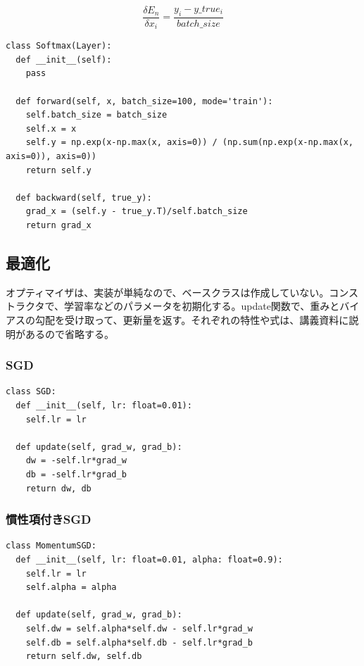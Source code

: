 \documentclass[platex,dvipdfmx]{jsarticle}
\begin{document}
\[
  \frac{\delta E_n}{\delta x_i} = \frac{y_i - y\_true_i}{batch\_size}
\]

\begin{lstlisting}[caption=ex\_advanced.py, label=Softmax]
class Softmax(Layer):
  def __init__(self):
    pass

  def forward(self, x, batch_size=100, mode='train'):
    self.batch_size = batch_size
    self.x = x
    self.y = np.exp(x-np.max(x, axis=0)) / (np.sum(np.exp(x-np.max(x, axis=0)), axis=0))
    return self.y

  def backward(self, true_y):
    grad_x = (self.y - true_y.T)/self.batch_size
    return grad_x
\end{lstlisting}

\newpage

\subsection{最適化}

オプティマイザは、実装が単純なので、ベースクラスは作成していない。コンストラクタで、学習率などのパラメータを初期化する。update関数で、重みとバイアスの勾配を受け取って、更新量を返す。それぞれの特性や式は、講義資料に説明があるので省略する。

\subsubsection{SGD}

\begin{lstlisting}[caption=ex\_advanced.py, label=SGD]
class SGD:
  def __init__(self, lr: float=0.01):
    self.lr = lr
  
  def update(self, grad_w, grad_b):
    dw = -self.lr*grad_w
    db = -self.lr*grad_b
    return dw, db
\end{lstlisting}

\subsubsection{慣性項付きSGD}

\begin{lstlisting}[caption=ex\_advanced.py, label=MomentumSGD]
class MomentumSGD:
  def __init__(self, lr: float=0.01, alpha: float=0.9):
    self.lr = lr
    self.alpha = alpha

  def update(self, grad_w, grad_b):
    self.dw = self.alpha*self.dw - self.lr*grad_w
    self.db = self.alpha*self.db - self.lr*grad_b
    return self.dw, self.db
\end{lstlisting}
\end{document}

